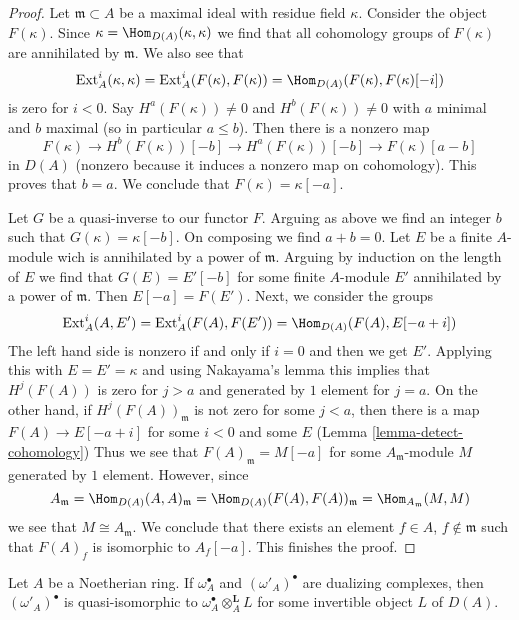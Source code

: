 \begin{proof}
Let $\mathfrak m \subset A$ be a maximal ideal with residue field $\kappa$.
Consider the object $F(\kappa)$. Since
$\kappa = \Hom_{D(A)}(\kappa, \kappa)$ we find that all
cohomology groups of $F(\kappa)$ are annihilated by $\mathfrak m$.
We also see that
$$
\text{Ext}^i_A(\kappa, \kappa) = \text{Ext}^i_A(F(\kappa), F(\kappa))
= \Hom_{D(A)}(F(\kappa), F(\kappa)[-i])
$$
is zero for $i < 0$. Say $H^a(F(\kappa)) \not = 0$ and
$H^b(F(\kappa)) \not = 0$ with $a$ minimal and $b$ maximal
(so in particular $a \leq b$). Then there is a nonzero map
$$
F(\kappa) \to H^b(F(\kappa))[-b] \to H^a(F(\kappa))[-b]
\to F(\kappa)[a - b]
$$
in $D(A)$ (nonzero because it induces a nonzero map on cohomology).
This proves that $b = a$. We conclude that $F(\kappa) = \kappa[-a]$.

\medskip\noindent
Let $G$ be a quasi-inverse to our functor $F$. Arguing as above
we find an integer $b$ such that $G(\kappa) = \kappa[-b]$.
On composing we find $a + b = 0$. Let $E$ be a finite $A$-module
wich is annihilated by a power of $\mathfrak m$. Arguing by
induction on the length of $E$ we find that $G(E) = E'[-b]$
for some finite $A$-module $E'$ annihilated by a power of
$\mathfrak m$. Then $E[-a] = F(E')$.
Next, we consider the groups
$$
\text{Ext}^i_A(A, E') = \text{Ext}^i_A(F(A), F(E')) =
\Hom_{D(A)}(F(A), E[-a + i])
$$
The left hand side is nonzero if and only if $i = 0$ and then
we get $E'$. Applying this with $E = E' = \kappa$ and using Nakayama's
lemma this implies that $H^j(F(A))$ is zero for $j > a$ and
generated by $1$ element for $j = a$. On the other hand, if
$H^j(F(A))_\mathfrak m$ is not zero for some $j < a$, then
there is a map $F(A) \to E[-a + i]$ for some $i < 0$ and some
$E$ (Lemma \ref{lemma-detect-cohomology})
Thus we see that $F(A)_\mathfrak m = M[-a]$
for some $A_\mathfrak m$-module $M$ generated by $1$ element.
However, since
$$
A_\mathfrak m = \Hom_{D(A)}(A, A)_\mathfrak m =
\Hom_{D(A)}(F(A), F(A))_\mathfrak m = \Hom_{A_\mathfrak m}(M, M)
$$
we see that $M \cong A_\mathfrak m$. We conclude that there exists
an element $f \in A$, $f \not \in \mathfrak m$ such that
$F(A)_f$ is isomorphic to $A_f[-a]$. This finishes the proof.
\end{proof}

\begin{lemma}
\label{lemma-dualizing-unique}
Let $A$ be a Noetherian ring. If $\omega_A^\bullet$ and
$(\omega'_A)^\bullet$ are dualizing complexes, then
$(\omega'_A)^\bullet$ is quasi-isomorphic to
$\omega_A^\bullet \otimes_A^\mathbf{L} L$
for some invertible object $L$ of $D(A)$.
\end{lemma}

